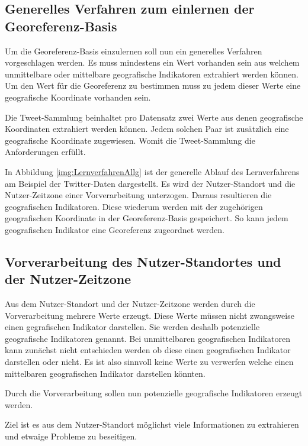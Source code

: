 		\subsection{Generelles Verfahren zum einlernen der Georeferenz-Basis}

			Um die Georeferenz-Basis einzulernen soll nun ein generelles Verfahren vorgeschlagen werden.
			Es muss mindestens ein Wert vorhanden sein aus welchem unmittelbare oder mittelbare geografische Indikatoren extrahiert werden können.
			Um den Wert für die Georeferenz zu bestimmen muss zu jedem dieser Werte eine geografische Koordinate vorhanden sein.

			Die Tweet-Sammlung beinhaltet pro Datensatz zwei Werte aus denen geografische Koordinaten extrahiert werden können.
			Jedem solchen Paar ist zusätzlich eine geografische Koordinate zugewiesen.
			Womit die Tweet-Sammlung die Anforderungen erfüllt.

			In Abbildung \ref{img:LernverfahrenAllg} ist der generelle Ablauf des Lernverfahrens am Beispiel der Twitter-Daten dargestellt.
			Es wird der Nutzer-Standort und die Nutzer-Zeitzone einer Vorverarbeitung unterzogen. 
			Daraus resultieren die geografischen Indikatoren.
			Diese wiederum werden mit der zugehörigen geografischen Koordinate in der Georeferenz-Basis gespeichert. 
			So kann jedem geografischen Indikator eine Georeferenz zugeordnet werden.

		\subsection{Vorverarbeitung des Nutzer-Standortes und der Nutzer-Zeitzone}

			Aus dem Nutzer-Standort und der Nutzer-Zeitzone werden durch die Vorverarbeitung mehrere Werte erzeugt. 
			Diese Werte müssen nicht zwangsweise einen gegrafischen Indikator darstellen. 
			Sie werden deshalb potenzielle geografische Indikatoren genannt.
			Bei unmittelbaren geografischen Indikatoren kann zunächst nicht entschieden werden ob diese einen geografischen Indikator darstellen oder nicht.
			Es ist also sinnvoll keine Werte zu verwerfen welche einen mittelbaren geografischen Indikator darstellen könnten.

			Durch die Vorverarbeitung sollen nun potenzielle geografische Indikatoren erzeugt werden.
			
			Ziel ist es aus dem Nutzer-Standort möglichst viele Informationen zu extrahieren und etwaige Probleme zu beseitigen.

